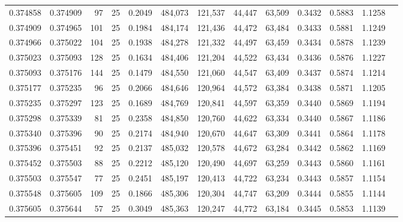 \begin{tabular}{rrrrrrrrrrrrr}
0.374858 & 0.374909 &    97 &  25 &                                     0.2049 & 484,073 & 121,537 &  44,447 &  63,509 & 0.3432 & 0.5883 & 1.1258 \\
0.374909 & 0.374965 &   101 &  25 &                                     0.1984 & 484,174 & 121,436 &  44,472 &  63,484 & 0.3433 & 0.5881 & 1.1249 \\
0.374966 & 0.375022 &   104 &  25 &                                     0.1938 & 484,278 & 121,332 &  44,497 &  63,459 & 0.3434 & 0.5878 & 1.1239 \\
0.375023 & 0.375093 &   128 &  25 &                                     0.1634 & 484,406 & 121,204 &  44,522 &  63,434 & 0.3436 & 0.5876 & 1.1227 \\
0.375093 & 0.375176 &   144 &  25 &                                     0.1479 & 484,550 & 121,060 &  44,547 &  63,409 & 0.3437 & 0.5874 & 1.1214 \\
0.375177 & 0.375235 &    96 &  25 &                                     0.2066 & 484,646 & 120,964 &  44,572 &  63,384 & 0.3438 & 0.5871 & 1.1205 \\
0.375235 & 0.375297 &   123 &  25 &                                     0.1689 & 484,769 & 120,841 &  44,597 &  63,359 & 0.3440 & 0.5869 & 1.1194 \\
0.375298 & 0.375339 &    81 &  25 &                                     0.2358 & 484,850 & 120,760 &  44,622 &  63,334 & 0.3440 & 0.5867 & 1.1186 \\
0.375340 & 0.375396 &    90 &  25 &                                     0.2174 & 484,940 & 120,670 &  44,647 &  63,309 & 0.3441 & 0.5864 & 1.1178 \\
0.375396 & 0.375451 &    92 &  25 &                                     0.2137 & 485,032 & 120,578 &  44,672 &  63,284 & 0.3442 & 0.5862 & 1.1169 \\
0.375452 & 0.375503 &    88 &  25 &                                     0.2212 & 485,120 & 120,490 &  44,697 &  63,259 & 0.3443 & 0.5860 & 1.1161 \\
0.375503 & 0.375547 &    77 &  25 &                                     0.2451 & 485,197 & 120,413 &  44,722 &  63,234 & 0.3443 & 0.5857 & 1.1154 \\
0.375548 & 0.375605 &   109 &  25 &                                     0.1866 & 485,306 & 120,304 &  44,747 &  63,209 & 0.3444 & 0.5855 & 1.1144 \\
0.375605 & 0.375644 &    57 &  25 &                                     0.3049 & 485,363 & 120,247 &  44,772 &  63,184 & 0.3445 & 0.5853 & 1.1139 \\

\end{tabular}
